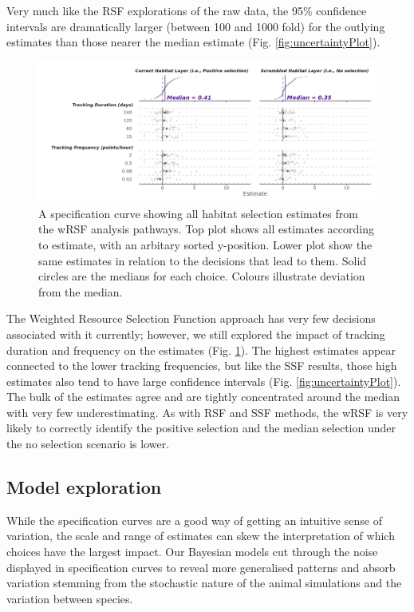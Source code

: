 \documentclass[10pt,a4paper]{article}
\begin{document}
Very much like the RSF explorations of the raw data, the 95\% confidence intervals are dramatically larger (between 100 and 1000 fold) for the outlying estimates than those nearer the median estimate (Fig. \ref{fig:uncertaintyPlot}).

\begin{figure}
\includegraphics[width=1\linewidth]{../figures/wrsfSpecCurve} \caption{A specification curve showing all habitat selection estimates from the wRSF analysis pathways. Top plot shows all estimates according to estimate, with an arbitary sorted y-position. Lower plot show the same estimates in relation to the decisions that lead to them. Solid circles are the medians for each choice. Colours illustrate deviation from the median.}\label{fig:specCurveWRSF}
\end{figure}

The Weighted Resource Selection Function approach has very few decisions associated with it currently; however, we still explored the impact of tracking duration and frequency on the estimates (Fig. \ref{fig:specCurveWRSF}).
The highest estimates appear connected to the lower tracking frequencies, but like the SSF results, those high estimates also tend to have large confidence intervals (Fig. \ref{fig:uncertaintyPlot}).
The bulk of the estimates agree and are tightly concentrated around the median with very few underestimating.
As with RSF and SSF methods, the wRSF is very likely to correctly identify the positive selection and the median selection under the no selection scenario is lower.

\hypertarget{model-exploration}{%
\subsection{Model exploration}\label{model-exploration}}

While the specification curves are a good way of getting an intuitive sense of variation, the scale and range of estimates can skew the interpretation of which choices have the largest impact.
Our Bayesian models cut through the noise displayed in specification curves to reveal more generalised patterns and absorb variation stemming from the stochastic nature of the animal simulations and the variation between species.
\end{document}
